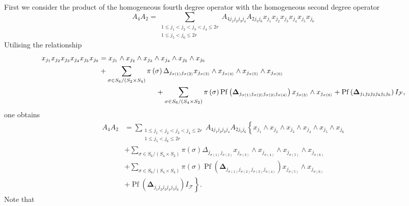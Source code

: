 \documentclass[aps, preprint]{revtex4}
\begin{document}
First we consider the product of the homogeneous fourth degree operator with the homogeneous second
degree operator
\begin{equation}A_{4} A_{2} =\sum _{\begin{array}{c}1 \leq j_{1} <j_{2} <j_{3} <j_{4} \leq 2 r \\
1 \leq j_{5} <j_{6} \leq 2 r\end{array}}A_{4 j_{1} j_{2} j_{3} j_{4}} A_{2 j_{5} j_{6}} x_{j_{1}} x_{j_{2}} x_{j_{3}} x_{j_{4}} x_{j_{5}} x_{j_{6}}
\end{equation}Utilising the relationship
\begin{align}x_{j_{1}} x_{j_{2}} x_{j_{3}} x_{j_{4}} x_{j_{5}} x_{j_{6}} &  =x_{j_{1}} \wedge x_{j_{2}} \wedge x_{j_{3}} \wedge x_{j_{4}} \wedge x_{j_{5}} \wedge x_{j_{6}} \nonumber  \\
 &  +\sum _{\sigma  \in S_{6}/\left (S_{2} \times S_{4}\right )}\pi  \left (\sigma \right )  \Delta _{j_{\sigma  \left (1\right )} j_{\sigma  \left (2\right )}}x_{j_{\sigma  \left (3\right )}} \wedge x_{j_{\sigma  \left (4\right )}} \wedge x_{j_{\sigma  \left (5\right )}} \wedge x_{j_{\sigma  \left (6\right )}} \nonumber  \\
 & \text{\quad \quad \quad \quad \quad \quad \quad \quad } +\sum _{\sigma  \in S_{6}/\left (S_{4} \times S_{2}\right )}\pi  \left (\sigma \right ) \ensuremath{\operatorname*{Pf}} \left (\mathbf{\Delta }_{j_{\sigma  \left (1\right )} j_{\sigma  \left (2\right )} j_{\sigma  \left (3\right )} j_{\sigma  \left (4\right )}}\right ) x_{j_{\sigma  \left (5\right )}} \wedge x_{j_{\sigma  \left (6\right )}} +\ensuremath{\operatorname*{Pf}} \left (\mathbf{\Delta }_{j_{1} j_{2} j_{3} j_{4} j_{5} j_{6}}\right ) I_{\mathcal{F}}\text{,}\end{align}one obtains
\begin{align}A_{4} A_{2} &  =\sum _{\begin{array}{c}1 \leq j_{1} <j_{2} <j_{3} <j_{4} \leq 2 r \\
1 \leq j_{5} <j_{6} \leq 2 r\end{array}}A_{4 j_{1} j_{2} j_{3} j_{4}} A_{2 j_{5} j_{6}}\left \{x_{j_{1}} \wedge x_{j_{2}} \wedge x_{j_{3}} \wedge x_{j_{4}} \wedge x_{j_{5}} \wedge x_{j_{6}}\right . \nonumber  \\
 &  +\sum _{\sigma  \in S_{6}/\left (S_{4} \times S_{2}\right )}\pi  \left (\sigma \right )  \Delta _{j_{\sigma  \left (1\right )} j_{\sigma  \left (2\right )}}x_{j_{\sigma  \left (3\right )}} \wedge x_{j_{\sigma  \left (4\right )}} \wedge x_{j_{\sigma  \left (5\right )}} \wedge x_{j_{\sigma  \left (6\right )}} \nonumber  \\
 &  +\sum _{\sigma  \in S_{6}/\left (S_{4} \times S_{4}\right )}\pi  \left (\sigma \right ) \ensuremath{\operatorname*{Pf}} \left (\mathbf{\Delta }_{j_{\sigma  \left (1\right )} j_{\sigma  \left (2\right )} j_{\sigma  \left (3\right )} j_{\sigma  \left (4\right )}}\right ) x_{j_{\sigma  \left (5\right )}} \wedge x_{j_{\sigma  \left (6\right )}} \nonumber  \\
 &  +\left .\ensuremath{\operatorname*{Pf}} \left (\mathbf{\Delta }_{j_{1} j_{2} j_{3} j_{4} j_{5} j_{6}}\right ) I_{\mathcal{F}}\right \}\text{.}\end{align}Note that
\end{document}
